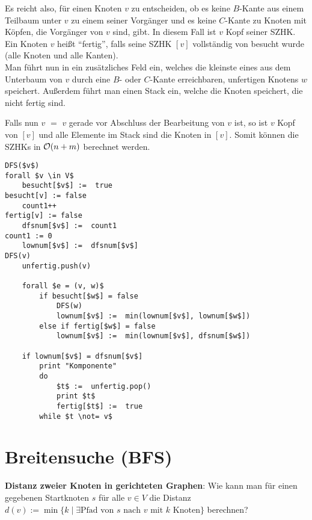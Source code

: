 \linie

Es reicht also, für einen Knoten $v$ zu entscheiden, ob es keine $B$-Kante
aus einem Teilbaum unter $v$ zu einem seiner Vorgänger und es keine $C$-Kante
zu Knoten mit Köpfen, die Vorgänger von $v$ sind, gibt.
In diesem Fall ist $v$ Kopf seiner SZHK. \\
Ein Knoten $v$ heißt "`fertig"', falls seine SZHK $[v]$ vollständig von
 besucht wurde (alle Knoten und alle Kanten). \\
Man führt nun in  ein zusätzliches Feld  ein, welches
die kleinste  eines aus dem Unterbaum von $v$ durch eine
$B$- oder $C$-Kante erreichbaren, unfertigen Knotens $w$ speichert.
Außerdem führt man einen Stack  ein, welche die Knoten
speichert, die nicht fertig sind.

Falls nun \code{dfsnum[}$v$\code{]} $=$ \code{lownum[}$v$\code{]} gerade
vor Abschluss der Bearbeitung von $v$\code{)} ist,
so ist $v$ Kopf von $[v]$ und alle Elemente im Stack  sind
die Knoten in $[v]$.
Somit können die SZHKs in $\mathcal{O}(n + m)$ berechnet werden.

\begin{lstlisting}
DFS($v$)                                                            forall $v \in V$
    besucht[$v$] :=  true                                                besucht[v] := false
    count1++                                                         fertig[v] := false
    dfsnum[$v$] :=  count1                                               count1 := 0
    lownum[$v$] :=  dfsnum[$v$]                                             DFS(v)
    unfertig.push(v)

    forall $e = (v, w)$
        if besucht[$w$] = false
            DFS(w)
            lownum[$v$] :=  min(lownum[$v$], lownum[$w$])
        else if fertig[$w$] = false
            lownum[$v$] :=  min(lownum[$v$], dfsnum[$w$])

    if lownum[$v$] = dfsnum[$v$]
        print "Komponente"
        do
            $t$ :=  unfertig.pop()
            print $t$
            fertig[$t$] :=  true
        while $t \not= v$
\end{lstlisting}

\section{%
    Breitensuche (BFS)%
}

\textbf{Distanz zweier Knoten in gerichteten Graphen}:
Wie kann man für einen gegebenen Startknoten $s$ für alle $v \in V$ die
Distanz $d(v) := \min\{k \;|\; \exists\text{Pfad von } s \text{ nach } v
\text{ mit } k \text{ Knoten}\}$ berechnen?

